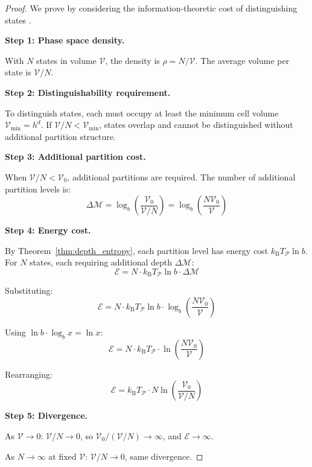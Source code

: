 \documentclass[twocolumn,10pt,a4paper]{article}
\theoremstyle{definition}
\theoremstyle{remark}
\newcommand{\kB}{k_{\mathrm{B}}}
\newcommand{\Partition}{\mathcal{P}}
\newcommand{\Depth}{\mathcal{M}}
\newcommand{\Cost}{\mathcal{E}}
\begin{document}
\begin{proof}
We prove by considering the information-theoretic cost of distinguishing states \cite{landauer1961}.

\textbf{Step 1: Phase space density.}

With $N$ states in volume $\mathcal{V}$, the density is $\rho = N/\mathcal{V}$. The average volume per state is $\mathcal{V}/N$.

\textbf{Step 2: Distinguishability requirement.}

To distinguish states, each must occupy at least the minimum cell volume $\mathcal{V}_{\min} = h^d$. If $\mathcal{V}/N < \mathcal{V}_{\min}$, states overlap and cannot be distinguished without additional partition structure.

\textbf{Step 3: Additional partition cost.}

When $\mathcal{V}/N < \mathcal{V}_0$, additional partitions are required. The number of additional partition levels is:
\begin{equation}
    \Delta\Depth = \log_b\left(\frac{\mathcal{V}_0}{\mathcal{V}/N}\right) = \log_b\left(\frac{N\mathcal{V}_0}{\mathcal{V}}\right)
\end{equation}

\textbf{Step 4: Energy cost.}

By Theorem~\ref{thm:depth_entropy}, each partition level has energy cost $\kB T_{\Partition} \ln b$. For $N$ states, each requiring additional depth $\Delta\Depth$:
\begin{equation}
    \Cost = N \cdot \kB T_{\Partition} \ln b \cdot \Delta\Depth
\end{equation}

Substituting:
\begin{equation}
    \Cost = N \cdot \kB T_{\Partition} \ln b \cdot \log_b\left(\frac{N\mathcal{V}_0}{\mathcal{V}}\right)
\end{equation}

Using $\ln b \cdot \log_b x = \ln x$:
\begin{equation}
    \Cost = N \cdot \kB T_{\Partition} \cdot \ln\left(\frac{N\mathcal{V}_0}{\mathcal{V}}\right)
\end{equation}

Rearranging:
\begin{equation}
    \Cost = \kB T_{\Partition} \cdot N \ln\left(\frac{\mathcal{V}_0}{\mathcal{V}/N}\right)
\end{equation}

\textbf{Step 5: Divergence.}

As $\mathcal{V} \to 0$: $\mathcal{V}/N \to 0$, so $\mathcal{V}_0/(\mathcal{V}/N) \to \infty$, and $\Cost \to \infty$.

As $N \to \infty$ at fixed $\mathcal{V}$: $\mathcal{V}/N \to 0$, same divergence.
\end{proof}
\end{document}
